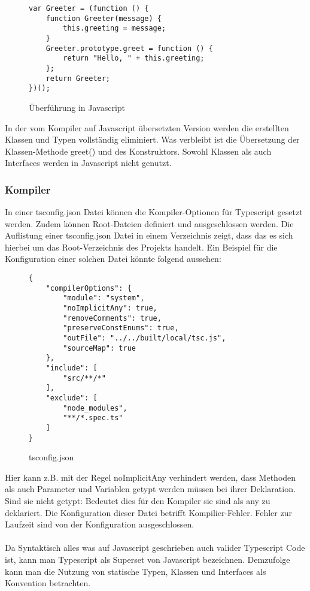 \begin{figure}[t]
\begin{lstlisting}
var Greeter = (function () {
    function Greeter(message) {
        this.greeting = message;
    }
    Greeter.prototype.greet = function () {
        return "Hello, " + this.greeting;
    };
    return Greeter;
})(); 
\end{lstlisting}
\caption{Überführung in Javascript \cite{typescript-example}}
\end{figure}
In der vom Kompiler auf Javascript übersetzten Version werden die erstellten Klassen und Typen vollständig eliminiert. Was verbleibt ist die Übersetzung der Klassen-Methode greet() und des Konstruktors. Sowohl Klassen als auch Interfaces werden in Javascript nicht genutzt.

\subsubsection{Kompiler}

In einer tsconfig.json Datei können die Kompiler-Optionen für Typescript gesetzt werden. Zudem können Root-Dateien definiert und ausgeschlossen werden. Die Auflistung einer tsconfig.json Datei in einem Verzeichnis zeigt, dass das es sich hierbei um das Root-Verzeichnis des Projekts handelt. Ein Beispiel für die Konfiguration einer solchen Datei könnte folgend aussehen: 

\begin{figure}[h!]
\begin{lstlisting}
{
    "compilerOptions": {
        "module": "system",
        "noImplicitAny": true,
        "removeComments": true,
        "preserveConstEnums": true,
        "outFile": "../../built/local/tsc.js",
        "sourceMap": true
    },
    "include": [
        "src/**/*"
    ],
    "exclude": [
        "node_modules",
        "**/*.spec.ts"
    ]
}  
\end{lstlisting}
\caption{tsconfig.json \cite{tsconfig}}
\end{figure}
Hier kann z.B. mit der Regel 
\glqq noImplicitAny\grqq{} verhindert werden, dass Methoden als auch Parameter und Variablen getypt werden müssen bei ihrer Deklaration. Sind sie nicht getypt: Bedeutet dies für den Kompiler sie sind als any zu deklariert.
Die Konfiguration dieser Datei betrifft Kompilier-Fehler. Fehler zur Laufzeit sind von der Konfiguration ausgeschlossen.\\\\

Da Syntaktisch alles was auf Javascript geschrieben auch valider Typescript Code ist, kann man Typescript als Superset von Javascript bezeichnen.
Demzufolge kann man die Nutzung von  statische Typen, Klassen und Interfaces als Konvention betrachten.

